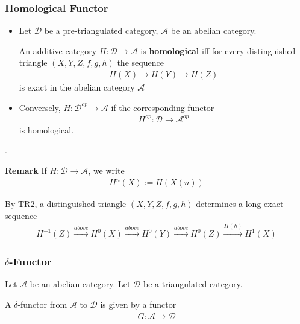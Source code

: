 \documentclass[Total.tex]{subfiles}
\begin{document}
			\subsubsection{Homological Functor}
			\begin{Def}
				\begin{itemize}
					\item Let $\mathcal{D}$ be a pre-triangulated category, $\mathcal{A}$ be an abelian category.
					
					An additive category $H:\mathcal{D}\rightarrow \mathcal{A}$ is \textbf{homological} iff for every distinguished  triangle $(X,Y,Z,f,g,h)$ the sequence
					\begin{gather*}
						H(X)\rightarrow H(Y)\rightarrow H(Z)
					\end{gather*}
					is exact in the abelian category $\mathcal{A}$
					\item Conversely, $H:\mathcal{D}^{op}\rightarrow \mathcal{A}$ if the corresponding functor
					\begin{gather*}
						H^{op}:\mathcal{D}\rightarrow \mathcal{A}^{op}
					\end{gather*}
					is homological.
				\end{itemize}.
			\end{Def}
			\textbf{Remark} If $H:\mathcal{D}\rightarrow \mathcal{A}$, we write
			\begin{gather*}
				H^n(X):=H(X(n))
			\end{gather*}
				\begin{Def}
					By TR2, a distinguished triangle $(X,Y,Z,f,g,h)$ determines a long exact sequence
					\begin{gather*}
						H^{-1}(Z)\stackrel{above}{\rightarrow} H^0(X)\stackrel{above}{\rightarrow} H^0(Y)\stackrel{above}{\rightarrow} H^0(Z)\stackrel{H(h)}{\rightarrow} H^1(X)
					\end{gather*}
				\end{Def}
				\subsubsection{$\delta$-Functor}
				\begin{Def}
					Let $\mathcal{A}$ be an abelian category. Let $\mathcal{D}$ be a triangulated category. 
					
					A $\delta$-functor from $\mathcal{A}$ to $\mathcal{D}$ is given by a functor
					\begin{gather*}
						G:\mathcal{A}\rightarrow \mathcal{D}
					\end{gather*}
				\end{Def}
\end{document}

